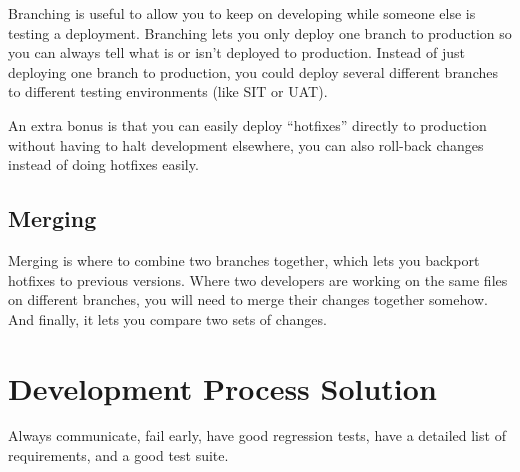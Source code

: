 Branching is useful to allow you to keep on developing while someone else is testing a deployment.
Branching lets you only deploy one branch to production so you can always tell what is or isn't deployed to production.
Instead of just deploying one branch to production, you could deploy several different branches to different testing environments (like SIT or UAT).

An extra bonus is that you can easily deploy ``hotfixes'' directly to production without having to halt development elsewhere, you can also roll-back changes instead of doing hotfixes easily.

\subsection{Merging}\label{sub:merging}

Merging is where to combine two branches together, which lets you backport hotfixes to previous versions.
Where two developers are working on the same files on different branches, you will need to merge their changes together somehow.
And finally, it lets you compare two sets of changes.

\section{Development Process Solution}\label{sec:development_process_solution}

Always communicate, fail early, have good regression tests, have a detailed list of requirements, and a good test suite.
